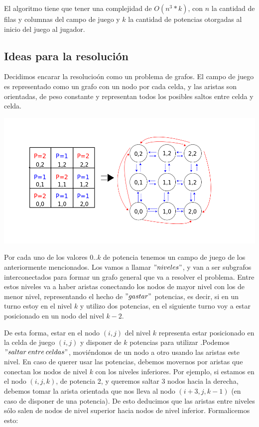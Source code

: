 El algoritmo tiene que tener una complejidad de $O(n^3*k)$, con $n$ la cantidad de filas y columnas del campo de juego y $k$ la cantidad de potencias otorgadas al inicio del juego al jugador.
\vspace{2mm}
\subsection{Ideas para la resoluci\'on} \label{ej_3:idea}

Decidimos encarar la resolucio\'on como un problema de grafos. El campo de juego es representado como un grafo con un nodo por cada celda, y las aristas son orientadas, de peso constante y representan todos los posibles saltos entre celda y celda. 
\begin{center}
\includegraphics[scale=0.5]{images/grafo1}
\end{center}
\vspace{2mm}


Por cada uno de los valores $0..k$ de potencia tenemos un campo de juego de los anteriormente mencionados. Los vamos a llamar $"niveles"$, y van a ser subgrafos interconectados para formar un grafo general que va a resolver el problema. Entre estos niveles va a haber aristas conectando los nodos de mayor nivel con los de menor nivel, representando el hecho de $"gastar"$ potencias, es decir, si en un turno estoy en el nivel $k$ y utilizo dos potencias, en el siguiente turno voy a estar posicionado en un nodo del nivel $k-2$.

\vspace{2mm}

De esta forma, estar en el nodo $(i,j)$ del nivel $k$ representa estar posicionado en la celda de juego $(i,j)$ y disponer de $k$ potencias para utilizar .Podemos $"saltar \: entre \: celdas"$, movi\'endonos de un nodo a otro usando las aristas este nivel. En caso de querer usar las potencias, debemos movernos por aristas que conectan los nodos de nivel $k$ con los niveles inferiores. Por ejemplo, si estamos en el nodo $(i,j,k)$, de potencia 2, y queremos saltar 3 nodos hacia la derecha, debemos tomar la arista orientada que nos lleva al nodo $(i+3,j,k-1)$ (en caso de disponer de una potencia). De esto deducimos que las aristas entre niveles s\'olo salen de nodos de nivel superior hacia nodos de nivel inferior. Formalicemos esto:


